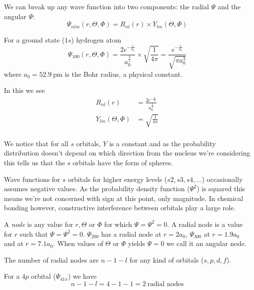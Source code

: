 \documentclass[../mit-general-chemistry.tex]{subfiles}
\begin{document}
We can break up any wave function into two components: the radial
$\Psi$ and the angular $\Psi$:
\begin{equation}
  \Psi_{nlm}(r, \Theta, \Phi) = R_{nl}(r) \times Y_{lm}(\Theta, \Phi)
\end{equation}


For a ground state ($1s$) hydrogen atom 
\begin{equation}
  \Psi_{100}(r, \Theta, \Phi) =
  \frac{2e^{-\frac{r}{a_0}}}{a_0^{\frac{3}{2}}} \times
  \sqrt{\frac{1}{4\pi}} =
  \frac{e^{-\frac{r}{a_0}}}{\sqrt{\pi a_0^3}}
\end{equation}
where $a_0 = \SI{52.9}{\pico\meter}$ is the Bohr radius, a physical
constant.



In this we see
\begin{align*}
    R_{nl}(r) &= \frac{2e^{-\frac{r}{a_0}}}{a_0^{\frac{3}{2}}} \\
    Y_{lm}(\Theta, \Phi) &= \sqrt{\frac{1}{4\pi}} \\
\end{align*}

We notice that for all $s$ orbitals, $Y$ is a constant and as the
probability distribution doesn't depend on which direction from the
nucleus we're considering this tells us that the $s$ orbitals have the
form of spheres.




Wave functions for $s$ orbitals for higher energy levels ($s2, s3, s4,
...$) occasionally assumes negative values. As the probability density
function ($\Psi^2$) is squared this means we're not concerned with
sign at this point, only magnitude. In chemical bonding however,
constructive interference between orbitals play a large role.

A {\em node} is any value for $r, \Theta$ or $\Phi$ for which $\Psi =
\Psi^2 = 0$. A radial node is a value for $r$ such that $\Psi = \Psi^2
= 0$. $\Psi_{200}$ has a radial node at $r = 2 a_0$, $\Psi_{300}$ at
$r = 1.9 a_0$ and at $r = 7.1 a_0$. When values of $\Theta$ or $\Phi$
yields $\Psi = 0$ we call it an angular node.

The number of radial nodes are $n - 1 - l$ for any kind of orbitals
($s, p, d, f$).


\begin{example}
  For a $4p$ orbital ($\Psi_{41x}$) we have
  \begin{equation*}
    n - 1 - l = 4 -1 -1 = 2\ \text{radial nodes}
  \end{equation*}
\end{example}
\end{document}
